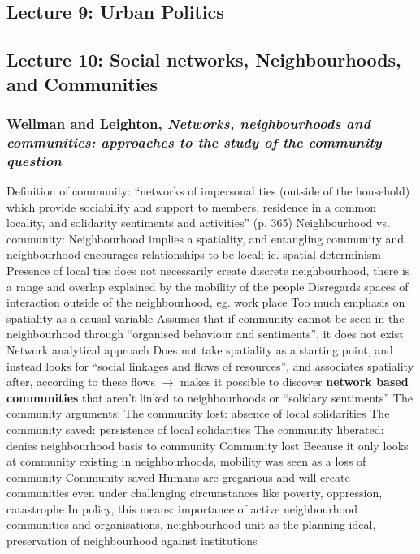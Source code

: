 \documentclass{article}
\begin{document}
\subsection{Lecture 9: Urban Politics}

\subsection{Lecture 10: Social networks, Neighbourhoods, and Communities}

\subsubsection{Wellman and Leighton, \textit{Networks, neighbourhoods and communities: approaches to the study of the community question}}

\begin{outline}
	\1 Definition of community: ``networks of impersonal ties (outside of the household) which provide sociability and support to members, residence in a common locality, and solidarity sentiments and activities'' (p. 365)
	\1 Neighbourhood vs. community:
		\2 Neighbourhood implies a spatiality, and entangling community and neighbourhood encourages relationships to be local; ie. spatial determinism
		\2 Presence of local ties does not necessarily create discrete neighbourhood, there is a range and overlap explained by the mobility of the people
		\2 Disregards spaces of interaction outside of the neighbourhood, eg. work place
		\2 Too much emphasis on spatiality as a causal variable
		\2 Assumes that if community cannot be seen in the neighbourhood through ``organised behaviour and sentiments'', it does not exist
	\1 Network analytical approach 
		\2 Does not take spatiality as a starting point, and instead looks for ``social linkages and flows of resources'', and associates spatiality after, according to these flows $\rightarrow$ makes it possible to discover \textbf{network based communities} that aren't linked to neighbourhoods or ``solidary sentiments''
	\1 The community arguments:
		\2 The community lost: absence of local solidarities
		\2 The community saved: persistence of local solidarities
		\2 The community liberated: denies neighbourhood basis to community
	\1 Community lost
		\2 Because it only looks at community existing in neighbourhoods, mobility was seen as a loss of community
	\1 Community saved
		\2 Humans are gregarious and will create communities even under challenging circumstances like poverty, oppression, catastrophe
		\2 In policy, this means: importance of active neighbourhood communities and organisations, neighbourhood unit as the planning ideal, preservation of neighbourhood against institutions

\end{outline}
\end{document}
